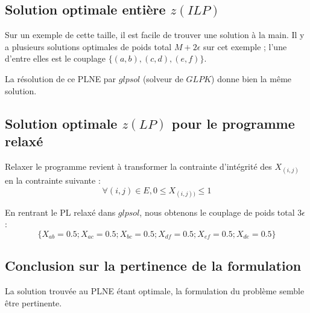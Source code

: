 \subsection{Solution optimale entière $z(ILP)$}
Sur un exemple de cette taille, il est facile de trouver une solution à la main. Il y a plusieurs solutions optimales de poids total $M+2\epsilon$ sur cet exemple ; l'une d'entre elles est le couplage $\{(a,b), (c,d), (e,f)\}$.

La résolution de ce PLNE par $glpsol$ (solveur de $GLPK$) donne bien la même solution.

\subsection{Solution optimale $z(LP)$ pour le programme relaxé}
Relaxer le programme revient à transformer la contrainte d'intégrité des $X_{(i,j)}$ en la contrainte suivante :
$$ \forall{(i,j) \in E},  0 \leq X_{(i,j))} \leq 1 $$

En rentrant le PL relaxé dans $glpsol$, nous obtenons le couplage de poids total $3\epsilon$ : $$\{X_{ab} = 0.5 ; X_{ac} = 0.5 ; X_{bc} = 0.5 ; X_{df} = 0.5 ; X_{ef} = 0.5 ; X_{de} = 0.5\}$$ 

\subsection{Conclusion sur la pertinence de la formulation}
La solution trouvée au PLNE étant optimale, la formulation du problème semble être pertinente.


